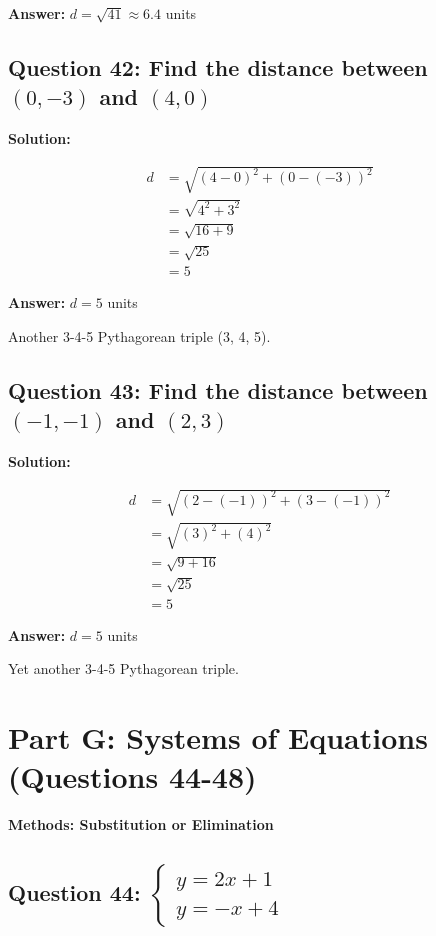 \documentclass[12pt]{article}
\begin{document}
\textbf{Answer: } $d = \sqrt{41} \approx 6.4$ units

\vspace{0.3cm}

\subsection*{Question 42: Find the distance between $(0, -3)$ and $(4, 0)$}

\noindent\textbf{Solution:}

\begin{align*}
d &= \sqrt{(4 - 0)^2 + (0 - (-3))^2} \\
&= \sqrt{4^2 + 3^2} \\
&= \sqrt{16 + 9} \\
&= \sqrt{25} \\
&= 5
\end{align*}

\textbf{Answer: } $d = 5$ units

Another 3-4-5 Pythagorean triple (3, 4, 5).

\vspace{0.3cm}

\subsection*{Question 43: Find the distance between $(-1, -1)$ and $(2, 3)$}

\noindent\textbf{Solution:}

\begin{align*}
d &= \sqrt{(2 - (-1))^2 + (3 - (-1))^2} \\
&= \sqrt{(3)^2 + (4)^2} \\
&= \sqrt{9 + 16} \\
&= \sqrt{25} \\
&= 5
\end{align*}

\textbf{Answer: } $d = 5$ units

Yet another 3-4-5 Pythagorean triple.

\newpage

\section{Part G: Systems of Equations (Questions 44-48)}

\textbf{Methods: Substitution or Elimination}

\subsection*{Question 44: $\begin{cases} y = 2x + 1 \\ y = -x + 4 \end{cases}$}
\end{document}
